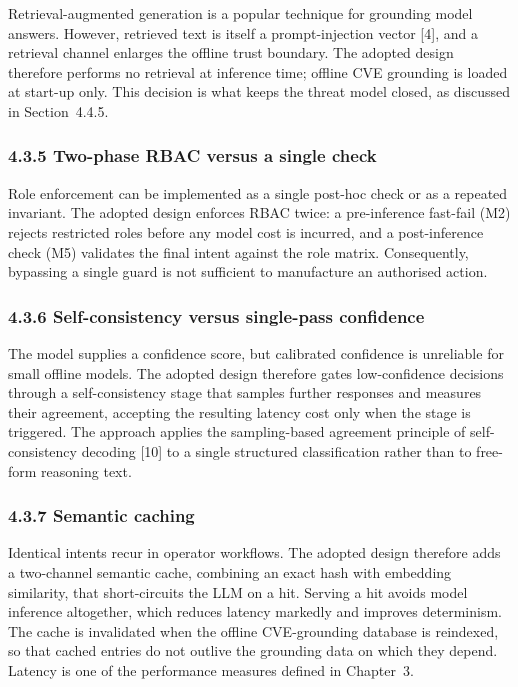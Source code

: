 \documentclass[
]{article}
\begin{document}
Retrieval-augmented generation is a popular technique for grounding
model answers. However, retrieved text is itself a prompt-injection
vector {[}4{]}, and a retrieval channel enlarges the offline trust
boundary. The adopted design therefore performs no retrieval at
inference time; offline CVE grounding is loaded at start-up only. This
decision is what keeps the threat model closed, as discussed in
Section~4.4.5.

\hypertarget{two-phase-rbac-versus-a-single-check}{%
\subsubsection{4.3.5 Two-phase RBAC versus a single
check}\label{two-phase-rbac-versus-a-single-check}}

Role enforcement can be implemented as a single post-hoc check or as a
repeated invariant. The adopted design enforces RBAC twice: a
pre-inference fast-fail (M2) rejects restricted roles before any model
cost is incurred, and a post-inference check (M5) validates the final
intent against the role matrix. Consequently, bypassing a single guard
is not sufficient to manufacture an authorised action.

\hypertarget{self-consistency-versus-single-pass-confidence}{%
\subsubsection{4.3.6 Self-consistency versus single-pass
confidence}\label{self-consistency-versus-single-pass-confidence}}

The model supplies a confidence score, but calibrated confidence is
unreliable for small offline models. The adopted design therefore gates
low-confidence decisions through a self-consistency stage that samples
further responses and measures their agreement, accepting the resulting
latency cost only when the stage is triggered. The approach applies the
sampling-based agreement principle of self-consistency decoding {[}10{]}
to a single structured classification rather than to free-form reasoning
text.

\hypertarget{semantic-caching}{%
\subsubsection{4.3.7 Semantic caching}\label{semantic-caching}}

Identical intents recur in operator workflows. The adopted design
therefore adds a two-channel semantic cache, combining an exact hash
with embedding similarity, that short-circuits the LLM on a hit. Serving
a hit avoids model inference altogether, which reduces latency markedly
and improves determinism. The cache is invalidated when the offline
CVE-grounding database is reindexed, so that cached entries do not
outlive the grounding data on which they depend. Latency is one of the
performance measures defined in Chapter~3.
\end{document}
